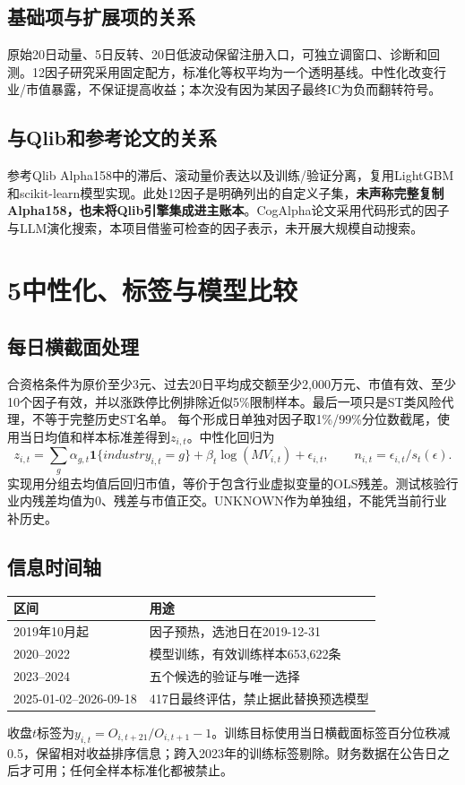 \documentclass[UTF8,a4paper,10pt]{ctexart}
\newcommand{\page}[1]{\newpage\section*{#1}}
\begin{document}
\subsection*{基础项与扩展项的关系}
原始20日动量、5日反转、20日低波动保留注册入口，可独立调窗口、诊断和回测。12因子研究采用固定配方，标准化等权平均为一个透明基线。中性化改变行业/市值暴露，不保证提高收益；本次没有因为某因子最终IC为负而翻转符号。
\subsection*{与Qlib和参考论文的关系}
参考Qlib Alpha158中的滞后、滚动量价表达以及训练/验证分离，复用LightGBM和scikit-learn模型实现。此处12因子是明确列出的自定义子集，\textbf{未声称完整复制Alpha158，也未将Qlib引擎集成进主账本}。CogAlpha论文采用代码形式的因子与LLM演化搜索，本项目借鉴可检查的因子表示，未开展大规模自动搜索。

\page{5\quad 中性化、标签与模型比较}
\subsection*{每日横截面处理}
合资格条件为原价至少3元、过去20日平均成交额至少2,000万元、市值有效、至少10个因子有效，并以涨跌停比例排除近似5\%限制样本。最后一项只是ST类风险代理，不等于完整历史ST名单。
每个形成日单独对因子取1\%/99\%分位数截尾，使用当日均值和样本标准差得到\(z_{i,t}\)。中性化回归为
\[
z_{i,t}=\sum_g\alpha_{g,t}\mathbf1\{industry_{i,t}=g\}+\beta_t\log(MV_{i,t})+\epsilon_{i,t},\qquad
n_{i,t}=\epsilon_{i,t}/s_t(\epsilon).
\]
实现用分组去均值后回归市值，等价于包含行业虚拟变量的OLS残差。测试核验行业内残差均值为0、残差与市值正交。UNKNOWN作为单独组，不能凭当前行业补历史。
\subsection*{信息时间轴}
\begin{center}\begin{tabular}{ll}\toprule
区间 & 用途\\\midrule
2019年10月起 & 因子预热，选池日在2019-12-31\\
2020--2022 & 模型训练，有效训练样本653,622条\\
2023--2024 & 五个候选的验证与唯一选择\\
2025-01-02--2026-09-18 & 417日最终评估，禁止据此替换预选模型\\\bottomrule
\end{tabular}\end{center}
收盘\(t\)标签为\(y_{i,t}=O_{i,t+21}/O_{i,t+1}-1\)。训练目标使用当日横截面标签百分位秩减0.5，保留相对收益排序信息；跨入2023年的训练标签剔除。财务数据在公告日之后才可用；任何全样本标准化都被禁止。
\end{document}
